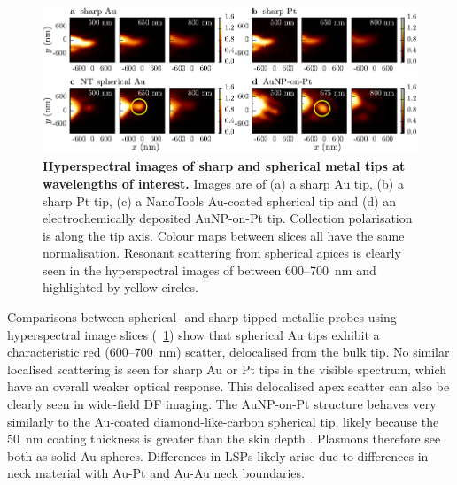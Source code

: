 \documentclass{article}
\begin{document}
\begin{figure}[bt]
\centering
\includegraphics{figures/hyperspectral_tip_comparison}
\caption[Hyperspectral images of sharp and spherical metal tips at wavelengths of interest]{\textbf{Hyperspectral images of sharp and spherical metal tips at wavelengths of interest.} Images are of (a) a sharp Au tip, (b) a sharp Pt tip, (c) a NanoTools Au-coated spherical tip and (d) an electrochemically deposited AuNP-on-Pt tip. Collection polarisation is along the tip axis. Colour maps between slices all have the same normalisation. Resonant scattering from spherical apices is clearly seen in the hyperspectral images of between 600--\SI{700}{nm} and highlighted by yellow circles.}
\label{fig:hyperspectral_tip_comparison}
\vspace{-5pt}
\end{figure}

Comparisons between spherical- and sharp-tipped metallic probes using hyperspectral image slices (\figurename~\ref{fig:hyperspectral_tip_comparison}) show that spherical Au tips exhibit a characteristic red (600--\SI{700}{nm}) scatter, delocalised from the bulk tip. No similar localised scattering is seen for sharp Au or Pt tips in the visible spectrum, which have an overall weaker optical response. This delocalised apex scatter can also be clearly seen in wide-field DF imaging.
The AuNP-on-Pt structure behaves very similarly to the Au-coated diamond-like-carbon spherical tip, likely because the \SI{50}{nm} coating thickness is greater than the skin depth \cite{stockman2011, huber2014}. Plasmons therefore see both as solid Au spheres. Differences in LSPs likely arise due to differences in neck material with Au-Pt and Au-Au neck boundaries.
\end{document}
